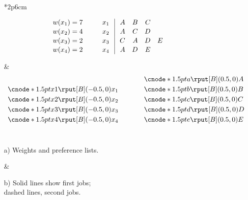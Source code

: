 \documentclass[11pt]{article}
\begin{document}
\begin{figure}[t]
\small
\begin{center}
\begin{tabular}{*{2}{p{6cm}}}

\[\begin{array}{lll|rrrr}
w(x_1) = 7 & \hspace{0.3cm} & x_1 \hspace{0.1cm}&\hspace{0.1cm} A & B & C  \\[0.05cm]
w(x_2) = 4 & & x_2 & A & C & D  \\[0.05cm]
w(x_3) = 2 & & x_3 & C & A & D & E  \\[0.05cm]
w(x_4) = 2 & & x_4 & A & D & E
\end{array}\]

& 
\vspace{-1em}
\[\begin{array}{ll}
 & \cnode*{1.5pt}{a} \rput[B](0.5,0){A} \\[0.1cm]
\cnode*{1.5pt}{x1} \rput[B](-0.5,0){x_1}  \hspace{2.75em} & \cnode*{1.5pt}{b} \rput[B](0.5,0){B} \\[0.1cm]
\cnode*{1.5pt}{x2} \rput[B](-0.5,0){x_2} & \cnode*{1.5pt}{c} \rput[B](0.5,0){C} \\[0.1cm]
\cnode*{1.5pt}{x3} \rput[B](-0.5,0){x_3} & \cnode*{1.5pt}{d} \rput[B](0.5,0){D} \\[0.1cm]
\cnode*{1.5pt}{x4} \rput[B](-0.5,0){x_4} & \cnode*{1.5pt}{e} \rput[B](0.5,0){E}
\end{array}\]
\\[-1em]
\begin{center}
a) Weights and preference lists.
\end{center} &
\begin{center}
b) Solid lines show first jobs; \\ \hspace{1.5ex} dashed lines, second jobs. 
\end{center}
\\[1em]


\end{tabular}
\end{center}
\end{figure}
\end{document}
